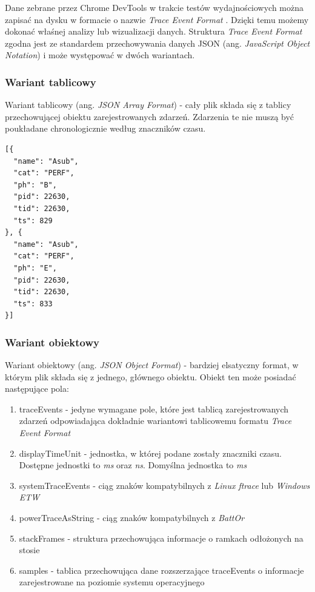 \documentclass[polish, twoside, 12pt]{mwart}
\begin{document}
Dane zebrane przez Chrome DevTools w trakcie testów wydajnościowych można zapisać na dysku w formacie o nazwie \emph{Trace Event Format} \cite{trace-event-format}. Dzięki temu możemy dokonać właśnej analizy lub wizualizacji danych. Struktura \emph{Trace Event Format} zgodna jest ze standardem przechowywania danych JSON (ang. \emph{JavaScript Object Notation}) \cite{json} i może występować w dwóch wariantach.

\subsubsection{Wariant tablicowy}
Wariant tablicowy (ang. \emph{JSON Array Format}) - cały plik składa się z tablicy przechowującej obiektu zarejestrowanych zdarzeń. Zdarzenia te nie muszą być poukładane chronologicznie według znaczników czasu. 

\begin{lstlisting}[caption=Przykładowy wariant tablicowy]
[{
  "name": "Asub",
  "cat": "PERF",
  "ph": "B",
  "pid": 22630,
  "tid": 22630,
  "ts": 829
}, {
  "name": "Asub",
  "cat": "PERF",
  "ph": "E",
  "pid": 22630,
  "tid": 22630,
  "ts": 833
}]
\end{lstlisting}

\subsubsection{Wariant obiektowy}

Wariant obiektowy (ang. \emph{JSON Object Format}) - bardziej elsatyczny format, w którym plik składa się z jednego, głównego obiektu. Obiekt ten może posiadać następujące pola:

\begin{enumerate}
  \item traceEvents - jedyne wymagane pole, które jest tablicą zarejestrowanych zdarzeń odpowiadająca dokładnie wariantowi tablicowemu formatu \emph{Trace Event Format}
  \item displayTimeUnit - jednostka, w której podane zostały znaczniki czasu. Dostępne jednostki to \emph{ms} oraz \emph{ns}. Domyślna jednostka to \emph{ms}
  \item systemTraceEvents - ciąg znaków kompatybilnych z \emph{Linux ftrace} lub \emph{Windows ETW}
  \item powerTraceAsString - ciąg znaków kompatybilnych z \emph{BattOr}
  \item stackFrames - struktura przechowująca informacje o ramkach odłożonych na stosie
  \item samples - tablica przechowująca dane rozszerzające traceEvents o informacje zarejestrowane na poziomie systemu operacyjnego 
\end{enumerate}
\end{document}
